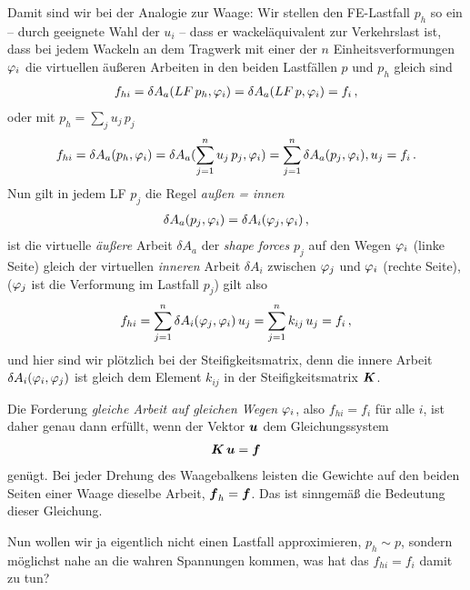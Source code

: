 Damit sind wir bei der  Analogie zur Waage: Wir stellen den FE-Lastfall $p_h $ so ein -- durch geeignete Wahl der $u_i$ -- dass er \glq wackel\"{a}quivalent\grq{} zur Verkehrslast ist, dass bei jedem Wackeln an dem Tragwerk mit einer der $n$ Einheitsverformungen $\varphi_i$ die virtuellen \"{a}u{\ss}eren Arbeiten in den beiden Lastf\"{a}llen $p$ und $p_h$ gleich sind
\begin{align}
f_{hi} =\delta A_a(LF\,p_h,\varphi_i) = \delta A_a(LF\,p,\varphi_i) = f_i\,,
\end{align}
oder mit $p_h = \sum_j u_j\,p_j$
\begin{align}
f_{hi} =\delta A_a(p_h,\varphi_i) = \delta A_a(\sum_{j = 1}^n u_j\,p_j,\varphi_i) = \sum_{j = 1}^n \delta A_a(p_j,\varphi_i),u_j = f_i\,.
\end{align}
Nun gilt in jedem LF $p_j$ die Regel {\em au{\ss}en = innen\/}
\begin{align}
\delta A_a(p_j, \varphi_i) = \delta A_i(\varphi_j,\varphi_i)\,,
\end{align}
ist die virtuelle {\em \"{a}u{\ss}ere\/} Arbeit $\delta A_a$ der {\em shape forces\/} $p_j$ auf den Wegen $\varphi_i$ (linke Seite) gleich der  virtuellen {\em inneren\/} Arbeit $\delta A_i$ zwischen $\varphi_j$ und $\varphi_i$ (rechte Seite), ($\varphi_j$ ist die Verformung im Lastfall $p_j$) gilt also
\begin{align}
f_{hi} =\sum_{j = 1}^n \delta A_i(\varphi_j,\varphi_i)\,u_j = \sum_{j = 1}^n k_{ij}\,u_j = f_i\,,
\end{align}
und hier sind wir pl\"{o}tzlich bei der Steifigkeitsmatrix, denn die innere Arbeit $\delta A_i(\varphi_i,\varphi_j)$
ist gleich dem Element $k_{ij} $ in der Steifigkeitsmatrix $\mbox{\boldmath $K$} $.

Die Forderung {\em gleiche Arbeit auf gleichen Wegen\/} $\varphi_i$, also $f_{hi} = f_i$ f\"{u}r alle $i$, ist daher genau dann erf\"{u}llt, wenn der Vektor $\mbox{\boldmath $u$} $ dem Gleichungssystem
\begin{align}
\mbox{\boldmath $K$}\,\mbox{\boldmath $u$} = \mbox{\boldmath $f$}
\end{align}
gen\"{u}gt. Bei jeder Drehung des Waagebalkens leisten die Gewichte auf den beiden Seiten einer Waage dieselbe Arbeit, $\mbox{\boldmath $f$}_h = \mbox{\boldmath $f$}$. Das ist sinngem\"{a}{\ss} die Bedeutung dieser Gleichung.

Nun wollen wir ja eigentlich nicht einen Lastfall approximieren, $p_h \sim p$, sondern m\"{o}glichst nahe an die wahren Spannungen kommen, was hat das $f_{hi} = f_i $ damit zu tun?


